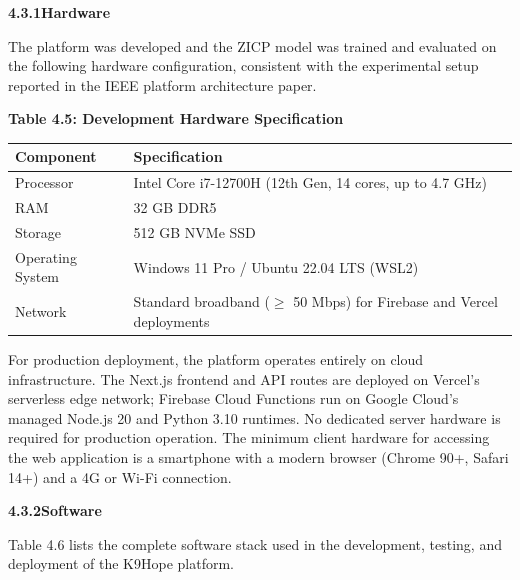 \documentclass[12pt,a4paper]{article}
\begin{document}
\vspace{1.5em}
\noindent\textbf{4.3.1\quad Hardware}
\vspace{0.6em}

\noindent The platform was developed and the ZICP model was trained and evaluated on the following hardware configuration, consistent with the experimental setup reported in the IEEE platform architecture paper.

\begin{center}
\textbf{Table 4.5: Development Hardware Specification}
\vspace{0.4em}
\begin{tabular}{ll}
\toprule
\textbf{Component} & \textbf{Specification} \\
\midrule
Processor & Intel Core i7-12700H (12th Gen, 14 cores, up to 4.7 GHz) \\
RAM & 32 GB DDR5 \\
Storage & 512 GB NVMe SSD \\
Operating System & Windows 11 Pro / Ubuntu 22.04 LTS (WSL2) \\
Network & Standard broadband ($\geq$ 50 Mbps) for Firebase and Vercel deployments \\
\bottomrule
\end{tabular}
\end{center}

\noindent For production deployment, the platform operates entirely on cloud infrastructure. The Next.js frontend and API routes are deployed on Vercel's serverless edge network; Firebase Cloud Functions run on Google Cloud's managed Node.js 20 and Python 3.10 runtimes. No dedicated server hardware is required for production operation. The minimum client hardware for accessing the web application is a smartphone with a modern browser (Chrome 90+, Safari 14+) and a 4G or Wi-Fi connection.

\vspace{1.5em}
\noindent\textbf{4.3.2\quad Software}
\vspace{0.6em}

\noindent Table 4.6 lists the complete software stack used in the development, testing, and deployment of the K9Hope platform.
\end{document}
